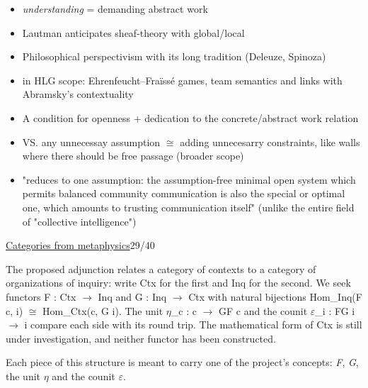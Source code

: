 \documentclass[a4paper,10pt]{article}
\newcommand{\slidehead}[2]{\par\addvspace{7pt}\noindent\underline{#1}\hfill{\color{gray}#2}\par\nopagebreak\vspace{1pt}}
\newcommand{\marked}[1]{\par\addvspace{2pt}{\bfseries #1}\par\nopagebreak}
\renewenvironment{leftbar}{%
  \def\FrameCommand{{\color{black!30}\vrule width 1.2pt}\hspace{6pt}}%
  \MakeFramed{\advance\hsize-\width \FrameRestore}}{\endMakeFramed}
\newenvironment{commentary}{\par\vspace{-2pt}\begin{leftbar}\color{black!80}}{\end{leftbar}}
\begin{document}
\begin{commentary}
\marked{\textcolor{optimalitygold}{Optimality}}
\begin{itemize}
\item \emph{understanding} = demanding abstract work
\end{itemize}
\marked{\textcolor{hoapaviolet}{Perspectivism}}
\begin{itemize}
\item Lautman anticipates sheaf-theory with global/local
\item Philosophical perspectivism with its long tradition (Deleuze, Spinoza)
\item in HLG scope: Ehrenfeucht–Fraïssé games, team semantics and links with Abramsky’s contextuality
\end{itemize}
\marked{\textcolor{presuppositionlessnessteal}{Presuppositionlessness}}
\begin{itemize}
\item A condition for openness + dedication to the concrete/abstract work relation
\item VS. any unnecessay assumption \ensuremath{\cong} adding unnecesarry constraints, like walls where there should be free passage (broader scope)
\end{itemize}\vspace{2pt}
\begin{itemize}
\item "reduces to one assumption: the assumption-free minimal open system which permits balanced community communication is also the special or optimal one, which amounts to trusting communication itself" (unlike the entire field of "collective intelligence")
\end{itemize}
\end{commentary}
\slidehead{Categories from metaphysics}{29/40}
The proposed adjunction relates a category of contexts to a category of organizations of inquiry: write Ctx for the first and Inq for the second. We seek functors F : Ctx \ensuremath{\to} Inq and G : Inq \ensuremath{\to} Ctx with natural bijections Hom\_Inq(F c, i) \ensuremath{\cong} Hom\_Ctx(c, G i). The unit \ensuremath{\eta}\_c : c \ensuremath{\to} GF c and the counit \ensuremath{\varepsilon}\_i : FG i \ensuremath{\to} i compare each side with its round trip. The mathematical form of Ctx is still under investigation, and neither functor has been constructed.\par
Each piece of this structure is meant to carry one of the project's concepts: \textcolor{complexityazure}{\emph{F}}, \textcolor{emergencecoral}{\emph{G}}, the unit \textcolor{praxispurple}{\emph{\ensuremath{\eta}}} and the counit \textcolor{anthropiclosspink}{\emph{\ensuremath{\varepsilon}}}.\par
\end{document}
